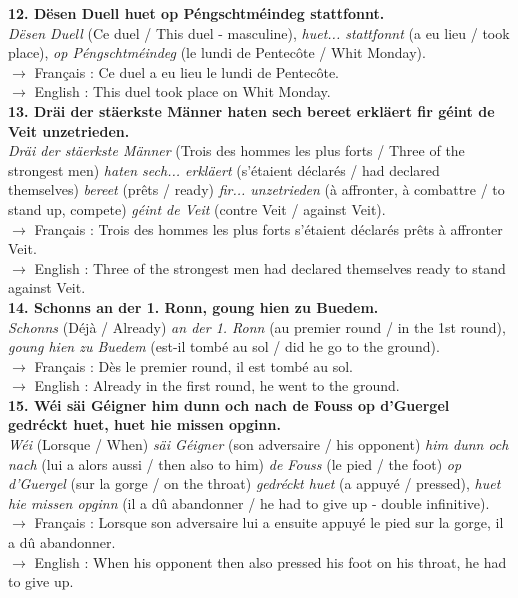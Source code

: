 \textbf{12. Dësen Duell huet op Péngschtméindeg stattfonnt.}\\
\textit{Dësen Duell} (Ce duel / This duel - masculine), \textit{huet... stattfonnt} (a eu lieu / took place), \textit{op Péngschtméindeg} (le lundi de Pentecôte / Whit Monday).\\
$\rightarrow$ Français : Ce duel a eu lieu le lundi de Pentecôte.\\
$\rightarrow$ English : This duel took place on Whit Monday.\\[0.5em]

\textbf{13. Dräi der stäerkste Männer haten sech bereet erkläert fir géint de Veit unzetrieden.}\\
\textit{Dräi der stäerkste Männer} (Trois des hommes les plus forts / Three of the strongest men) \textit{haten sech... erkläert} (s'étaient déclarés / had declared themselves) \textit{bereet} (prêts / ready) \textit{fir... unzetrieden} (à affronter, à combattre / to stand up, compete) \textit{géint de Veit} (contre Veit / against Veit).\\
$\rightarrow$ Français : Trois des hommes les plus forts s'étaient déclarés prêts à affronter Veit.\\
$\rightarrow$ English : Three of the strongest men had declared themselves ready to stand against Veit.\\[0.5em]

\textbf{14. Schonns an der 1. Ronn, goung hien zu Buedem.}\\
\textit{Schonns} (Déjà / Already) \textit{an der 1. Ronn} (au premier round / in the 1st round), \textit{goung hien zu Buedem} (est-il tombé au sol / did he go to the ground).\\
$\rightarrow$ Français : Dès le premier round, il est tombé au sol.\\
$\rightarrow$ English : Already in the first round, he went to the ground.\\[0.5em]

\textbf{15. Wéi säi Géigner him dunn och nach de Fouss op d'Guergel gedréckt huet, huet hie missen opginn.}\\
\textit{Wéi} (Lorsque / When) \textit{säi Géigner} (son adversaire / his opponent) \textit{him dunn och nach} (lui a alors aussi / then also to him) \textit{de Fouss} (le pied / the foot) \textit{op d'Guergel} (sur la gorge / on the throat) \textit{gedréckt huet} (a appuyé / pressed), \textit{huet hie missen opginn} (il a dû abandonner / he had to give up - double infinitive).\\
$\rightarrow$ Français : Lorsque son adversaire lui a ensuite appuyé le pied sur la gorge, il a dû abandonner.\\
$\rightarrow$ English : When his opponent then also pressed his foot on his throat, he had to give up.\\[0.5em]

